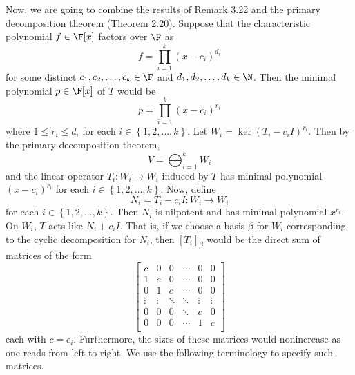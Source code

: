 \documentclass[linearalgebraII]{subfiles}
\begin{document}
    \begin{remark}
        Now, we are going to combine the results of Remark 3.22 and the primary decomposition theorem (Theorem 2.20). Suppose that the characteristic polynomial $f\in\F[x]$ factors over $\F$ as
        \begin{equation*}
            f = \prod^{k}_{i=1} \left( x-c_i \right) ^{d_i}
        \end{equation*}
        for some distinct $c_1,c_2,\ldots,c_k\in\F$ and $d_1,d_2,\ldots,d_k\in\N$. Then the minimal polynomial $p\in\F[x]$ of $T$ would be
        \begin{equation*}
            p = \prod^{k}_{i=1} \left( x-c_i \right) ^{r_i}
        \end{equation*}
        where $1\leq r_i\leq d_i$ for each $i\in\left\lbrace 1,2,\ldots,k \right\rbrace$. Let $W_i = \ker\left( T_i-c_iI \right)^{r_i}$. Then by the primary decomposition theorem,
        \begin{equation*}
            V = \bigoplus^{k}_{i=1} W_i
        \end{equation*}
        and the linear operator $T_i:W_i\to W_i$ induced by $T$ has minimal polynomial $\left( x-c_i \right) ^{r_i}$ for each $i\in\left\lbrace 1,2,\ldots,k \right\rbrace $. Now, define
        \begin{equation*}
            N_i = T_i-c_iI: W_i\to W_i
        \end{equation*}
        for each $i\in\left\lbrace 1,2,\ldots,k \right\rbrace$. Then $N_i$ is nilpotent and has minimal polynomial $x^{r_i}$. On $W_i$, $T$ acts like $N_i+c_iI$. That is, if we choose a basis $\beta$ for $W_i$ corresponding to the cyclic decomposition for $N_i$, then $\left[ T_i \right] _\beta$ would be the direct sum of matrices of the form
        \begin{equation*}
            \begin{bmatrix}
                c & 0 & 0 & \cdots & 0 & 0 \\
                1 & c & 0 & \cdots & 0 & 0 \\
                0 & 1 & c & \cdots & 0 & 0 \\
                \vdots & \vdots & \ddots & \ddots & \vdots & \vdots \\
                0 & 0 & 0 & \ddots & c & 0 \\
                0 & 0 & 0 & \cdots & 1 & c \\
            \end{bmatrix}
        \end{equation*}
        each with $c=c_i$. Furthermore, the sizes of these matrices would nonincrease as one reads from left to right. We use the following terminology to specify such matrices. 
    \end{remark}
\end{document}
